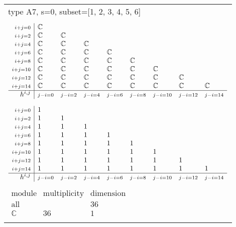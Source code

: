 \documentclass[crop,border=2mm]{standalone}
\begin{document}
\begin{tabular}{l}
{\huge type A7, s=0, subset=[1, 2, 3, 4, 5, 6]}\\ \\


$\displaystyle
\begin{array}{r|l l l l l l l l}
	{\scriptstyle i+j=0}&\mathbb{C}&&&&&&&\\
	{\scriptstyle i+j=2}&\mathbb{C}&\mathbb{C}&&&&&&\\
	{\scriptstyle i+j=4}&\mathbb{C}&\mathbb{C}&\mathbb{C}&&&&&\\
	{\scriptstyle i+j=6}&\mathbb{C}&\mathbb{C}&\mathbb{C}&\mathbb{C}&&&&\\
	{\scriptstyle i+j=8}&\mathbb{C}&\mathbb{C}&\mathbb{C}&\mathbb{C}&\mathbb{C}&&&\\
	{\scriptstyle i+j=10}&\mathbb{C}&\mathbb{C}&\mathbb{C}&\mathbb{C}&\mathbb{C}&\mathbb{C}&&\\
	{\scriptstyle i+j=12}&\mathbb{C}&\mathbb{C}&\mathbb{C}&\mathbb{C}&\mathbb{C}&\mathbb{C}&\mathbb{C}&\\
	{\scriptstyle i+j=14}&\mathbb{C}&\mathbb{C}&\mathbb{C}&\mathbb{C}&\mathbb{C}&\mathbb{C}&\mathbb{C}&\mathbb{C}\\
	\hline h^{i,j}&{\scriptstyle j-i=0}&{\scriptstyle j-i=2}&{\scriptstyle j-i=4}&{\scriptstyle j-i=6}&{\scriptstyle j-i=8}&{\scriptstyle j-i=10}&{\scriptstyle j-i=12}&{\scriptstyle j-i=14}
\end{array}
$ \\ \\


$\displaystyle
\begin{array}{r|l l l l l l l l}
	{\scriptstyle i+j=0}&1&&&&&&&\\
	{\scriptstyle i+j=2}&1&1&&&&&&\\
	{\scriptstyle i+j=4}&1&1&1&&&&&\\
	{\scriptstyle i+j=6}&1&1&1&1&&&&\\
	{\scriptstyle i+j=8}&1&1&1&1&1&&&\\
	{\scriptstyle i+j=10}&1&1&1&1&1&1&&\\
	{\scriptstyle i+j=12}&1&1&1&1&1&1&1&\\
	{\scriptstyle i+j=14}&1&1&1&1&1&1&1&1\\
	\hline h^{i,j}&{\scriptstyle j-i=0}&{\scriptstyle j-i=2}&{\scriptstyle j-i=4}&{\scriptstyle j-i=6}&{\scriptstyle j-i=8}&{\scriptstyle j-i=10}&{\scriptstyle j-i=12}&{\scriptstyle j-i=14}
\end{array}
$ \\ \\


$\displaystyle
\begin{array}{rll}
	\text{module}&\text{multiplicity}&\text{dimension} \\ \hline \text{all}&&36 \\
	\mathbb{C}&36&1
\end{array}
$ \\ \\

\end{tabular}
\end{document}

